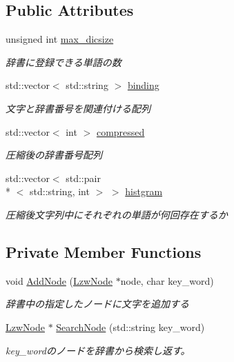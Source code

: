 \subsection*{Public Attributes}
\begin{DoxyCompactItemize}
\item 
unsigned int \hyperlink{classprdc__lzw_1_1Dictionary_a27f3bda2d7baeb3c7a62db57de66ffb7}{max\-\_\-dicsize}
\begin{DoxyCompactList}\small\item\em 辞書に登録できる単語の数 \end{DoxyCompactList}\item 
std\-::vector$<$ std\-::string $>$ \hyperlink{classprdc__lzw_1_1Dictionary_af5c7156370b9ee5d0e060624d409bce1}{binding}
\begin{DoxyCompactList}\small\item\em 文字と辞書番号を関連付ける配列 \end{DoxyCompactList}\item 
std\-::vector$<$ int $>$ \hyperlink{classprdc__lzw_1_1Dictionary_a18e15168c7acd82f062141627e5a8b75}{compressed}
\begin{DoxyCompactList}\small\item\em 圧縮後の辞書番号配列 \end{DoxyCompactList}\item 
std\-::vector$<$ std\-::pair\\*
$<$ std\-::string, int $>$ $>$ \hyperlink{classprdc__lzw_1_1Dictionary_a66677a981aa5a55b91978a5f642b9c06}{histgram}
\begin{DoxyCompactList}\small\item\em 圧縮後文字列中にそれぞれの単語が何回存在するか \end{DoxyCompactList}\end{DoxyCompactItemize}
\subsection*{Private Member Functions}
\begin{DoxyCompactItemize}
\item 
void \hyperlink{classprdc__lzw_1_1Dictionary_ad9a68c58a75d9eec5eb2aaf528b9fbe4}{Add\-Node} (\hyperlink{classprdc__lzw_1_1LzwNode}{Lzw\-Node} $\ast$node, char key\-\_\-word)
\begin{DoxyCompactList}\small\item\em 辞書中の指定したノードに文字を追加する \end{DoxyCompactList}\item 
\hyperlink{classprdc__lzw_1_1LzwNode}{Lzw\-Node} $\ast$ \hyperlink{classprdc__lzw_1_1Dictionary_a4d5f9c58f6aede7507b08d07d0ad7875}{Search\-Node} (std\-::string key\-\_\-word)
\begin{DoxyCompactList}\small\item\em key\-\_\-wordのノードを辞書から検索し返す。 \end{DoxyCompactList}\end{DoxyCompactItemize}
